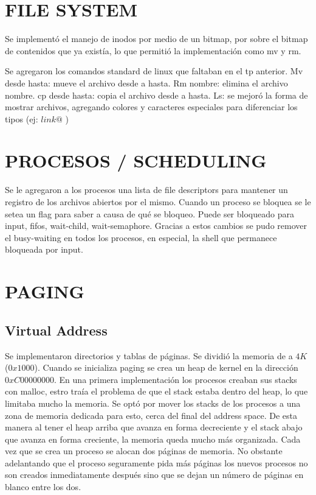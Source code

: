 \documentclass[english]{article}
\begin{document}
\section{FILE SYSTEM}

Se implementó el manejo de inodos por medio de un bitmap, por sobre
el bitmap de contenidos que ya existía, lo que permitió la implementación
como mv y rm.

Se agregaron los comandos standard de linux que faltaban en el tp
anterior. Mv desde hasta: mueve el archivo desde a hasta. Rm nombre:
elimina el archivo nombre. cp desde hasta: copia el archivo desde
a hasta. Ls: se mejoró la forma de mostrar archivos, agregando colores
y caracteres especiales para diferenciar los tipos (ej: $link@$ )


\section{PROCESOS / SCHEDULING}

Se le agregaron a los procesos una lista de file descriptors para
mantener un registro de los archivos abiertos por el mismo. Cuando
un proceso se bloquea se le setea un flag para saber a causa de qué
se bloqueo. Puede ser bloqueado para input, fifos, wait-child, wait-semaphore.
Gracias a estos cambios se pudo remover el busy-waiting en todos los
procesos, en especial, la shell que permanece bloqueada por input. 


\section{PAGING}


\subsection{Virtual Address}

Se implementaron directorios y tablas de páginas. Se dividió la memoria
de a $4K$ ($0x1000$). Cuando se inicializa paging se crea un heap
de kernel en la dirección $0xC00000000$. En una primera implementación
los procesos creaban sus stacks con malloc, estro traía el problema
de que el stack estaba dentro del heap, lo que limitaba mucho la memoria.
Se optó por mover los stacks de los procesos a una zona de memoria
dedicada para esto, cerca del final del address space. De esta manera
al tener el heap arriba que avanza en forma decreciente y el stack
abajo que avanza en forma creciente, la memoria queda mucho más organizada.
Cada vez que se crea un proceso se alocan dos páginas de memoria.
No obstante adelantando que el proceso seguramente pida más páginas
los nuevos procesos no son creados inmediatamente después sino que
se dejan un número de páginas en blanco entre los dos. 
\end{document}
